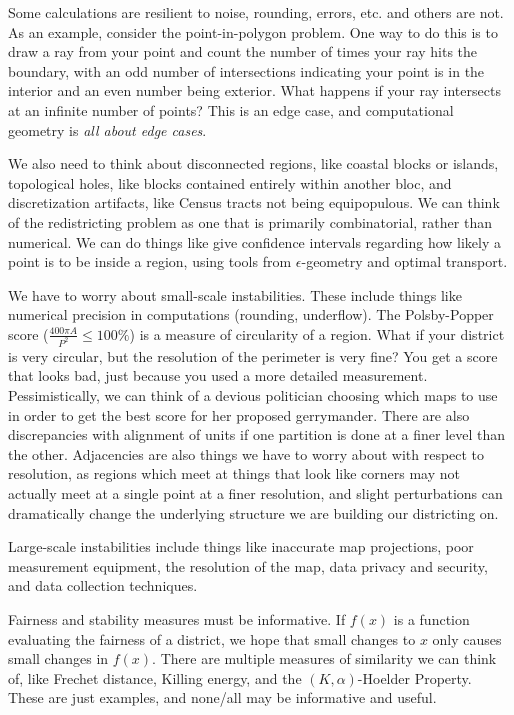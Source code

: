 Some calculations are resilient to noise, rounding, errors, etc. and others are not.  As an example, consider the point-in-polygon problem.  One way to do this is to draw a ray from your point and count the number of times your ray hits the boundary, with an odd number of intersections indicating your point is in the interior and an even number being exterior.  What happens if your ray intersects at an infinite number of points?  This is an edge case, and computational geometry is \textit{all about edge cases}.

We also need to think about disconnected regions, like coastal blocks or islands, topological holes, like blocks contained entirely within another bloc, and discretization artifacts, like Census tracts not being equipopulous.  We can think of the redistricting problem as one that is primarily combinatorial, rather than numerical.  We can do things like give confidence intervals regarding how likely a point is to be inside a region, using tools from $\epsilon$-geometry and optimal transport.

We have to worry about small-scale instabilities.  These include things like numerical precision in computations (rounding, underflow). The Polsby-Popper score ($\frac{400\pi A}{P^2} \leq 100\%$) is a measure of circularity of a region.  What if your district is very circular, but the resolution of the perimeter is very fine?  You get a score that looks bad, just because you used a more detailed measurement.  Pessimistically, we can think of a devious politician choosing which maps to use in order to get the best score for her proposed gerrymander.  There are also discrepancies with alignment of units if one partition is done at a finer level than the other.  Adjacencies are also things we have to worry about with respect to resolution, as regions which meet at things that look like corners may not actually meet at a single point at a finer resolution, and slight perturbations can dramatically change the underlying structure we are building our districting on.


Large-scale instabilities include things like inaccurate map projections, poor measurement equipment, the resolution of the map, data privacy and security, and data collection techniques.

Fairness and stability measures must be informative.  If $f(x)$ is a function evaluating the fairness of a district, we hope that small changes to $x$ only causes small changes in $f(x)$.  There are multiple measures of similarity we can think of, like Frechet distance, Killing energy, and the $(K,\alpha)$-Hoelder Property.  These are just examples, and none/all may be informative and useful.

